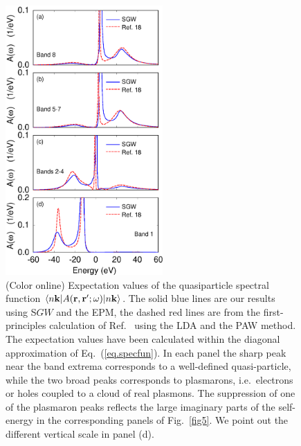 \documentclass[twocolumn,prb,showpacs,superscriptaddress]{revtex4}
\def\w{\omega}
\def\k{{\bf k}}
\def\r{{\bf r}}
\def\rp{{\bf r^\prime}}
\begin{document}
\begin  {figure}
\begin  {center}
\includegraphics[width=6cm]{fig6.eps}
\end    {center}
\caption{\label{fig6}
        (Color online)
        Expectation values of the quasiparticle spectral function $\langle n\k| A(\r,\rp;\w)|n\k\rangle$.
        The solid blue lines are our results using S$GW$ and the EPM, the dashed red lines are from the first-principles 
        calculation of Ref.\  using the LDA and the PAW method.
        The expectation values have been calculated within the diagonal approximation of Eq.\ (\ref{eq.specfun}).
        In each panel the sharp peak near the band extrema corresponds to a well-defined quasi-particle, while the two broad peaks
        corresponds to plasmarons, i.e.\ electrons or holes coupled to a cloud of real plasmons.\cite{hl}
        The suppression of one of the plasmaron peaks reflects the large imaginary parts of the self-energy in the
        corresponding panels of Fig.\ \ref{fig5}. We point out the different vertical scale in panel (d).
        }
\end    {figure}
\end{document}
